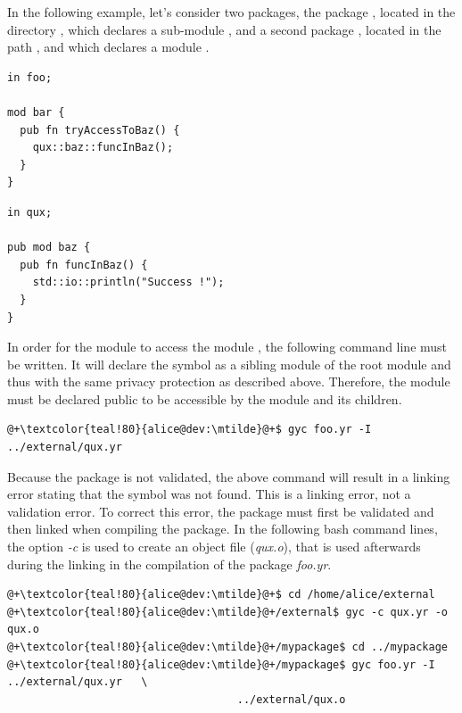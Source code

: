 In the following example, let's consider two packages, the package ,
located in the directory , which declares a
sub-module , and a second package , located in the path
, and which declares a module .

\begin{lstlisting}[caption=\textit{/home/alice/mypackage/foo.yr}, style=coloredverbatim]
in foo;

mod bar {
  pub fn tryAccessToBaz() {
    qux::baz::funcInBaz();
  }
}
\end{lstlisting}

\begin{lstlisting}[caption=\textit{/home/alice/external/qux.yr}, style=coloredverbatim]
in qux;

pub mod baz {
  pub fn funcInBaz() {
    std::io::println("Success !");
  }
}
\end{lstlisting}

In order for the module  to access the module
, the following command line must be written. It will declare
the symbol  as a sibling module of the root module  and
thus with the same privacy protection as described above. Therefore, the module
 must be declared public to be accessible by the module
 and its children.

\begin{lstlisting}[style=bashVerb, escapechar=@+]
@+\textcolor{teal!80}{alice@dev:\mtilde}@+$ gyc foo.yr -I ../external/qux.yr
\end{lstlisting}

Because the  package is not validated, the above command will result
in a linking error stating that the symbol  was not
found. This is a linking error, not a validation error. To correct this error,
the  package must first be validated and then linked when compiling
the  package. In the following bash command lines, the option
\textit{-c} is used to create an object file (\textit{qux.o}), that is used
afterwards during the linking in the compilation of the package \textit{foo.yr}.

\begin{lstlisting}[style=bashVerb, escapechar=@+]
@+\textcolor{teal!80}{alice@dev:\mtilde}@+$ cd /home/alice/external
@+\textcolor{teal!80}{alice@dev:\mtilde}@+/external$ gyc -c qux.yr -o qux.o
@+\textcolor{teal!80}{alice@dev:\mtilde}@+/mypackage$ cd ../mypackage
@+\textcolor{teal!80}{alice@dev:\mtilde}@+/mypackage$ gyc foo.yr -I ../external/qux.yr   \
                                    ../external/qux.o
\end{lstlisting}

